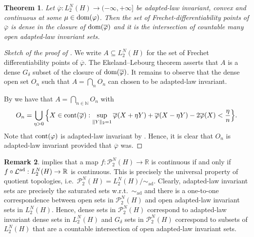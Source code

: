 \documentclass[a4paper]{amsart}
\newtheorem{theorem}{Theorem}
\numberwithin{theorem}{section}
\theoremstyle{definition}
\newtheorem{remark}[theorem]{Remark}
\newcommand{\N}{\mathbb{N}}
\newcommand{\R}{\mathbb{R}}
\newcommand{\law}{\mathcal{L}}
\newcommand{\dom}{\textup{dom}}
\newcommand{\Pc}{\mathcal P}
\renewcommand{\subset}{\subseteq}
\newcommand{\simad}{\sim_{\mathrm{ad}}}
\renewcommand{\H}{H}
\renewcommand{\phi}{\varphi}
\newcommand{\lawad}{\law^{\textup{ad}}}
\begin{document}
\begin{theorem} \label{thm:LconvexGdeltaDiff}
Let $\overline{\phi} : L_2^N(\H) \to (-\infty, +\infty]$ be adapted-law invariant, convex and continuous at some $\mu \in \dom(\phi)$. Then the set of Frechet-differentiability points of $\overline{\phi}$ is  dense in the closure of $\dom(\overline{\phi})$ and it is the intersection of countable many open adapted-law invariant sets.
\end{theorem}
\begin{proof}[Sketch of the proof of ]

We write $A \subset L_2^N(H)$ for the set of Frechet differentiability points of $\overline{\phi}$. The Ekeland--Lebourg theorem \cite[Theorem 18.3]{BaCo17} asserts that $A$ is a dense $G_\delta$ subset of the closure of $\dom(\overline{\phi})$. It remains to observe that the dense open set $O_n$ such that $A = \bigcap_n O_n$ can chosen to be adapted-law invariant. 

By \cite[Proposition 18.1]{BaCo17} we have that $A = \bigcap_{n \in \N} O_n$ with
\[
O_n = \bigcup_{\eta >0} \Big\{  X \in \textup{cont}(\overline{\phi})  : \sup_{ \|Y\|_2=1}  \overline{\phi}(X+ \eta Y) +  \overline{\phi}(X- \eta Y) -2 \overline{\phi}(X) < \frac{\eta}{n} \Big\}.
\]
Note that $\textup{cont}(\phi)$ is adapted-law invariant by . Hence, it is clear that $O_n$ is adapted-law invariant provided that $\overline{\phi}$ was. 
\end{proof}

\begin{remark}\label{rem:quotient_topology}
 implies that a map $f : \Pc_2^N(\H) \to \R$ is continuous if and only if $f \circ \lawad : L_2^N(\H) \to \R$ is continuous. This is precisely the universal property of quotient topologies, i.e.\  $\Pc_2^N(\H) =  L_2^N(\H)  / \simad $. Clearly, adapted-law invariant sets are precisely the saturated sets w.r.t.\ $\simad$ and there is a one-to-one correspondence between open sets in $\Pc_2^N(\H)$  and open adapted-law invariant sets in $L_2^N(\H)$. Hence, dense sets in  $\Pc_2^N(\H)$ correspond to adapted-law invariant dense sets in $L_2^N(\H)$ and $G_\delta$ sets in  $\Pc_2^N(\H)$ correspond to subsets of  $L_2^N(\H)$ that are a countable intersection of open adapted-law invariant sets. 
\end{remark}
\end{document}
